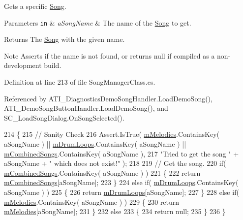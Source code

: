 Gets a specific \hyperlink{class_song}{Song}. 


\begin{DoxyParams}[1]{Parameters}
\mbox{\tt in}  & {\em a\+Song\+Name} & The name of the \hyperlink{class_song}{Song} to get. \\
\hline
\end{DoxyParams}
\begin{DoxyReturn}{Returns}
The \hyperlink{class_song}{Song} with the given name.
\end{DoxyReturn}
\begin{DoxyNote}{Note}
Asserts if the name is not found, or returns null if compiled as a non-\/development build. 
\end{DoxyNote}


Definition at line 213 of file Song\+Manager\+Class.\+cs.



Referenced by A\+T\+I\+\_\+\+Diagnostics\+Demo\+Song\+Handler.\+Load\+Demo\+Song(), A\+T\+I\+\_\+\+Demo\+Song\+Button\+Handler.\+Load\+Demo\+Song(), and S\+C\+\_\+\+Load\+Song\+Dialog.\+On\+Song\+Selected().


\begin{DoxyCode}
214     \{
215         \textcolor{comment}{// Sanity Check}
216         Assert.IsTrue( \hyperlink{group___s_m_priv_var_ga935e80f645d0546003f7df8443b79242}{mMelodies}.ContainsKey( aSongName ) || \hyperlink{group___s_m_priv_var_ga84f25335035755448d11acb9287360f2}{mDrumLoops}.ContainsKey( 
      aSongName ) || \hyperlink{group___s_m_priv_var_gaf6b4ff41b8da95d10ad3db62df111faa}{mCombinedSongs}.ContainsKey( aSongName ),
217             \textcolor{stringliteral}{"Tried to get the song "} + aSongName + \textcolor{stringliteral}{" which does not exist!"} );
218 
219         \textcolor{comment}{// Get the song.}
220         \textcolor{keywordflow}{if}( \hyperlink{group___s_m_priv_var_gaf6b4ff41b8da95d10ad3db62df111faa}{mCombinedSongs}.ContainsKey( aSongName ) )
221         \{
222             \textcolor{keywordflow}{return} \hyperlink{group___s_m_priv_var_gaf6b4ff41b8da95d10ad3db62df111faa}{mCombinedSongs}[aSongName];
223         \}
224         \textcolor{keywordflow}{else} \textcolor{keywordflow}{if}( \hyperlink{group___s_m_priv_var_ga84f25335035755448d11acb9287360f2}{mDrumLoops}.ContainsKey( aSongName ) )
225         \{
226             \textcolor{keywordflow}{return} \hyperlink{group___s_m_priv_var_ga84f25335035755448d11acb9287360f2}{mDrumLoops}[aSongName];
227         \}
228         \textcolor{keywordflow}{else} \textcolor{keywordflow}{if}( \hyperlink{group___s_m_priv_var_ga935e80f645d0546003f7df8443b79242}{mMelodies}.ContainsKey( aSongName ) )
229         \{
230             \textcolor{keywordflow}{return} \hyperlink{group___s_m_priv_var_ga935e80f645d0546003f7df8443b79242}{mMelodies}[aSongName];
231         \}
232         \textcolor{keywordflow}{else}
233         \{
234             \textcolor{keywordflow}{return} null;
235         \}
236     \}
\end{DoxyCode}
\mbox{\label{group___s_m_pub_func_ga2a9455a763e35cfb6b242a82f7d797ae}} 
